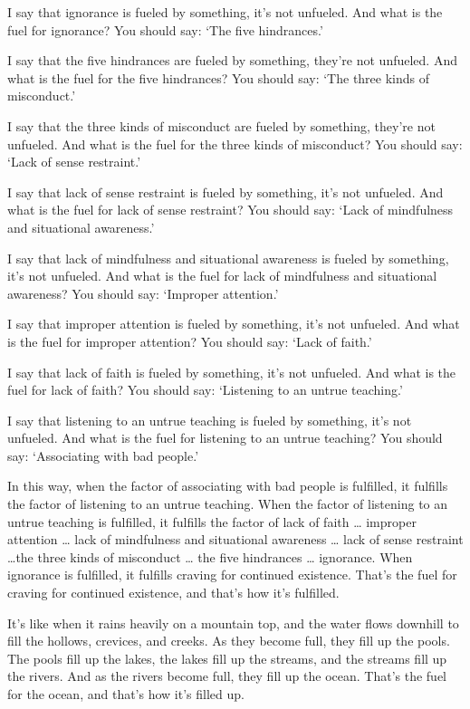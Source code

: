 \documentclass[12pt,openany]{book}%
\begin{document}
I say that ignorance is fueled by something, it’s not unfueled. And what is the fuel for ignorance? You should say: ‘The five hindrances.’ 

I say that the five hindrances are fueled by something, they’re not unfueled. And what is the fuel for the five hindrances? You should say: ‘The three kinds of misconduct.’ 

I say that the three kinds of misconduct are fueled by something, they’re not unfueled. And what is the fuel for the three kinds of misconduct? You should say: ‘Lack of sense restraint.’ 

I say that lack of sense restraint is fueled by something, it’s not unfueled. And what is the fuel for lack of sense restraint? You should say: ‘Lack of mindfulness and situational awareness.’ 

I say that lack of mindfulness and situational awareness is fueled by something, it’s not unfueled. And what is the fuel for lack of mindfulness and situational awareness? You should say: ‘Improper attention.’ 

I say that improper attention is fueled by something, it’s not unfueled. And what is the fuel for improper attention? You should say: ‘Lack of faith.’ 

I say that lack of faith is fueled by something, it’s not unfueled. And what is the fuel for lack of faith? You should say: ‘Listening to an untrue teaching.’ 

I say that listening to an untrue teaching is fueled by something, it’s not unfueled. And what is the fuel for listening to an untrue teaching? You should say: ‘Associating with bad people.’ 

In this way, when the factor of associating with bad people is fulfilled, it fulfills the factor of listening to an untrue teaching. When the factor of listening to an untrue teaching is fulfilled, it fulfills the factor of lack of faith … improper attention … lack of mindfulness and situational awareness … lack of sense restraint …the three kinds of misconduct … the five hindrances … ignorance. When ignorance is fulfilled, it fulfills craving for continued existence. That’s the fuel for craving for continued existence, and that’s how it’s fulfilled. 

It’s like when it rains heavily on a mountain top, and the water flows downhill to fill the hollows, crevices, and creeks. As they become full, they fill up the pools. The pools fill up the lakes, the lakes fill up the streams, and the streams fill up the rivers. And as the rivers become full, they fill up the ocean. That’s the fuel for the ocean, and that’s how it’s filled up. 
\end{document}
